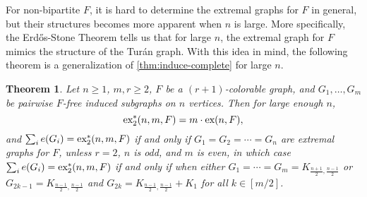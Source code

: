 \documentclass[12pt]{report}
\newtheorem{theorem}{Theorem}[chapter]
\newcommand*{\ex}{\textnormal{ex}}
\newcommand*{\dex}{\textnormal{ex}_2}
\begin{document}
For non-bipartite $F$, it is hard to determine the extremal graphs for $F$ in general, but their structures becomes more apparent when $n$ is large. More specifically, the Erdős-Stone Theorem tells us that for large $n$, the extremal graph for $F$ mimics the structure of the Turán graph. With this idea in mind, the following theorem is a generalization of \cref{thm:induce-complete} for large $n$.

\begin{theorem}
  Let $n \geq 1$, $m, r \geq 2$, $F$ be a $(r + 1)$-colorable graph, and $G_1, \ldots, G_m$ be pairwise $F$-free induced subgraphs on $n$ vertices. Then for large enough $n$,
  \[
    \dex^*(n, m, F) = m \cdot \ex(n, F),
  \]
  and $\sum_i e(G_i) = \dex^*(n, m, F)$ if and only if $G_1 = G_2 = \cdots = G_n$ are extremal graphs for $F$, unless $r = 2$, $n$ is odd, and $m$ is even, in which case $\sum_i e(G_i) = \dex^*(n, m, F)$ if and only if when either $G_1 = \cdots = G_m = K_{\frac{n + 1}{2}, \frac{n - 1}{2}}$ or $G_{2k - 1} = K_{\frac{n - 1}{2}, \frac{n - 1}{2}}$ and $G_{2k} = K_{\frac{n - 1}{2}, \frac{n - 1}{2}} + K_1$ for all $k \in [m/2]$.
\end{theorem}
\end{document}
